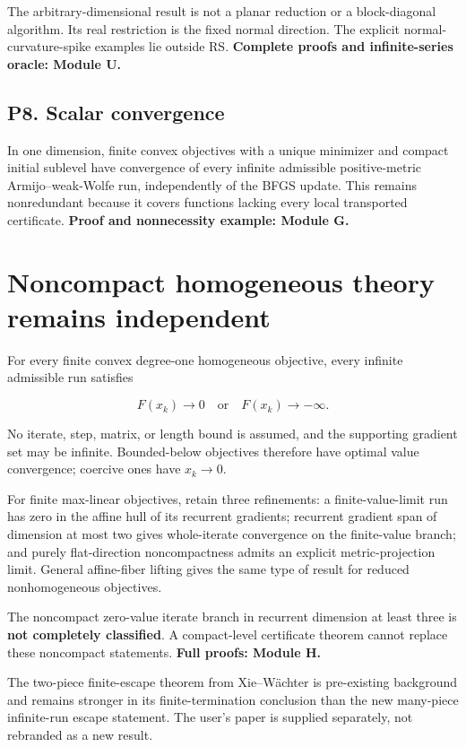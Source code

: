 The arbitrary-dimensional result is not a planar reduction or a block-diagonal algorithm. Its real restriction is the fixed normal direction. The explicit normal-curvature-spike examples lie outside RS. \textbf{Complete proofs and infinite-series oracle: Module U.}

\subsection{P8. Scalar convergence}\label{p8.-scalar-convergence}

In one dimension, finite convex objectives with a unique minimizer and compact initial sublevel have convergence of every infinite admissible positive-metric Armijo--weak-Wolfe run, independently of the BFGS update. This remains nonredundant because it covers functions lacking every local transported certificate. \textbf{Proof and nonnecessity example: Module G.}

\section{Noncompact homogeneous theory remains independent}\label{noncompact-homogeneous-theory-remains-independent}

For every finite convex degree-one homogeneous objective, every infinite admissible run satisfies

\[F(x_k)\to0\quad\text{or}\quad F(x_k)\to-\infty.\]

No iterate, step, matrix, or length bound is assumed, and the supporting gradient set may be infinite. Bounded-below objectives therefore have optimal value convergence; coercive ones have \(x_k\to0\).

For finite max-linear objectives, retain three refinements: a finite-value-limit run has zero in the affine hull of its recurrent gradients; recurrent gradient span of dimension at most two gives whole-iterate convergence on the finite-value branch; and purely flat-direction noncompactness admits an explicit metric-projection limit. General affine-fiber lifting gives the same type of result for reduced nonhomogeneous objectives.

The noncompact zero-value iterate branch in recurrent dimension at least three is \textbf{not completely classified}. A compact-level certificate theorem cannot replace these noncompact statements. \textbf{Full proofs: Module H.}

The two-piece finite-escape theorem from Xie--Wächter is pre-existing background and remains stronger in its finite-termination conclusion than the new many-piece infinite-run escape statement. The user's paper is supplied separately, not rebranded as a new result.

